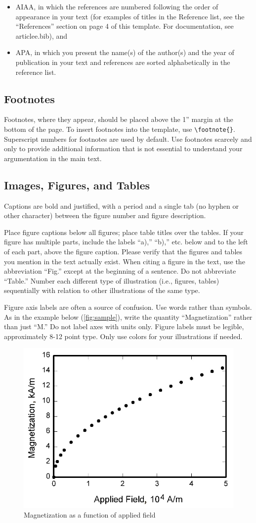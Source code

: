 \begin{itemize}
    \item AIAA, in which the references are numbered following the order of appearance in your text (for examples of titles in the Reference list, see the “References” section on page 4 of this template. For documentation, see articlee.bib), and
    \item APA, in which you present the name(s) of the author(s) and the year of publication in your text and references are sorted alphabetically in the reference list.
\end{itemize}

\subsection{Footnotes}
Footnotes, where they appear, should be placed above the 1” margin at the bottom of the page. To insert footnotes into the template, use \verb+\footnote{}+. Superscript numbers for footnotes are used by default. Use footnotes scarcely and only to provide additional information that is not essential to understand your argumentation in the main text.

\subsection{Images, Figures, and Tables}
Captions are bold and justified, with a period and a single tab (no hyphen or other character) between the figure number and figure description.

Place figure captions below all figures; place table titles over the tables. If your figure has multiple parts, include the labels “a),” “b),” etc. below and to the left of each part, above the figure caption. Please verify that the figures and tables you mention in the text actually exist. When citing a figure in the text, use the abbreviation “Fig.” except at the beginning of a sentence. Do not abbreviate “Table.” Number each different type of illustration (i.e., figures, tables) sequentially with relation to other illustrations of the same type.

Figure axis labels are often a source of confusion. Use words rather than symbols. As in the example below (\autoref{fig:sample}), write the quantity “Magnetization” rather than just “M.” Do not label axes with units only.
Figure labels must be legible, approximately 8-12 point type. Only use colors for your illustrations if needed.

\begin{figure}[htb]
    \centering
    \includegraphics[width=0.4\linewidth]{figures/graph.jpg}
    \caption{Magnetization as a function of applied field}
    \label{fig:sample}
\end{figure}

